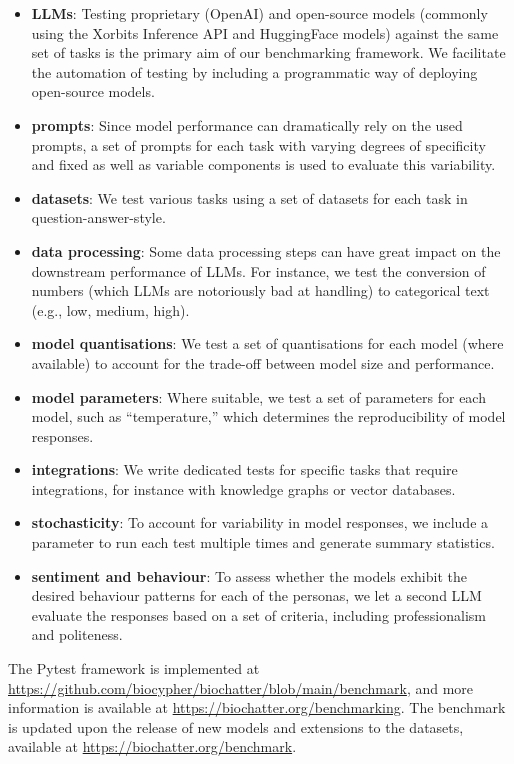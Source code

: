 \begin{itemize}
\item
  \textbf{LLMs}: Testing proprietary (OpenAI) and open-source models (commonly using the Xorbits Inference API and HuggingFace models) against the same set of tasks is the primary aim of our benchmarking framework. We facilitate the automation of testing by including a programmatic way of deploying open-source models.
\item
  \textbf{prompts}: Since model performance can dramatically rely on the used prompts, a set of prompts for each task with varying degrees of specificity and fixed as well as variable components is used to evaluate this variability.
\item
  \textbf{datasets}: We test various tasks using a set of datasets for each task in question-answer-style.
\item
  \textbf{data processing}: Some data processing steps can have great impact on the downstream performance of LLMs.
  For instance, we test the conversion of numbers (which LLMs are notoriously bad at handling) to categorical text (e.g., low, medium, high).
\item
  \textbf{model quantisations}: We test a set of quantisations for each model (where available) to account for the trade-off between model size and performance.
\item
  \textbf{model parameters}: Where suitable, we test a set of parameters for each model, such as ``temperature,'' which determines the reproducibility of model responses.
\item
  \textbf{integrations}: We write dedicated tests for specific tasks that require integrations, for instance with knowledge graphs or vector databases.
\item
  \textbf{stochasticity}: To account for variability in model responses, we include a parameter to run each test multiple times and generate summary statistics.
\item
  \textbf{sentiment and behaviour}: To assess whether the models exhibit the desired behaviour patterns for each of the personas, we let a second LLM evaluate the responses based on a set of criteria, including professionalism and politeness.
\end{itemize}

The Pytest framework is implemented at \url{https://github.com/biocypher/biochatter/blob/main/benchmark}, and more information is available at \url{https://biochatter.org/benchmarking}.
The benchmark is updated upon the release of new models and extensions to the datasets, available at \url{https://biochatter.org/benchmark}.

